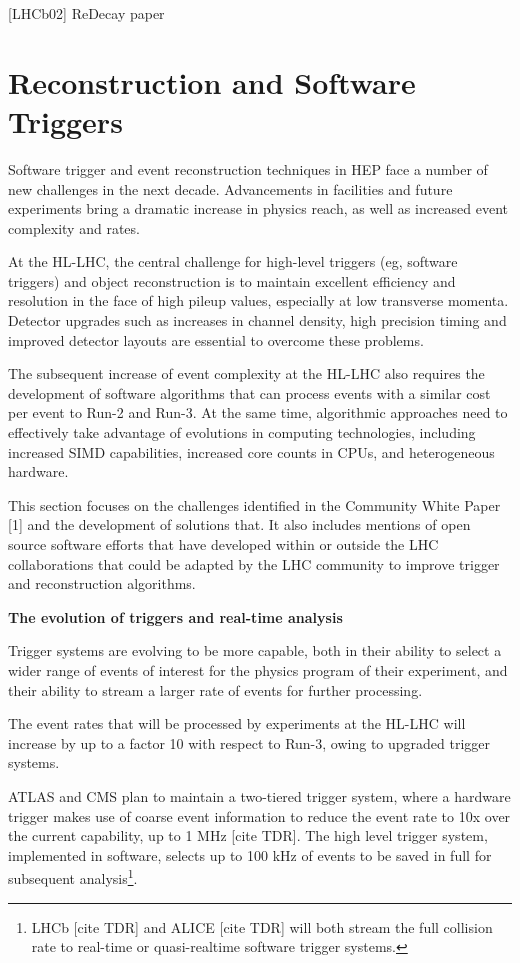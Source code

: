 \documentclass[11pt,a4paper]{article}
\begin{document}
{[}LHCb02{]} ReDecay paper

\hypertarget{reconstruction-and-software-triggers}{%
\section{Reconstruction and Software
Triggers}\label{reconstruction-and-software-triggers}}

Software trigger and event reconstruction techniques in HEP face a
number of new challenges in the next decade. Advancements in facilities
and future experiments bring a dramatic increase in physics reach, as
well as increased event complexity and rates.

At the HL-LHC, the central challenge for high-level triggers (eg,
software triggers) and object reconstruction is to maintain excellent
efficiency and resolution in the face of high pileup values, especially
at low transverse momenta. Detector upgrades such as increases in
channel density, high precision timing and improved detector layouts are
essential to overcome these problems.

The subsequent increase of event complexity at the HL-LHC also requires
the development of software algorithms that can process events with a
similar cost per event to Run-2 and Run-3. At the same time, algorithmic
approaches need to effectively take advantage of evolutions in computing
technologies, including increased SIMD capabilities, increased core
counts in CPUs, and heterogeneous hardware.

This section focuses on the challenges identified in the Community White
Paper {[}1{]} and the development of solutions that. It also includes
mentions of open source software efforts that have developed within or
outside the LHC collaborations that could be adapted by the LHC
community to improve trigger and reconstruction algorithms.

\textbf{The evolution of triggers and real-time analysis}

Trigger systems are evolving to be more capable, both in their ability
to select a wider range of events of interest for the physics program of
their experiment, and their ability to stream a larger rate of events
for further processing.

The event rates that will be processed by experiments at the HL-LHC will
increase by up to a factor 10 with respect to Run-3, owing to upgraded
trigger systems.

ATLAS and CMS plan to maintain a two-tiered trigger system, where a
hardware trigger makes use of coarse event information to reduce the
event rate to 10x over the current capability, up to 1 MHz {[}cite
TDR{]}. The high level trigger system, implemented in software, selects
up to 100 kHz of events to be saved in full for subsequent
analysis\footnote{LHCb {[}cite TDR{]} and ALICE {[}cite TDR{]} will both
  stream the full collision rate to real-time or quasi-realtime software
  trigger systems.}.
\end{document}
